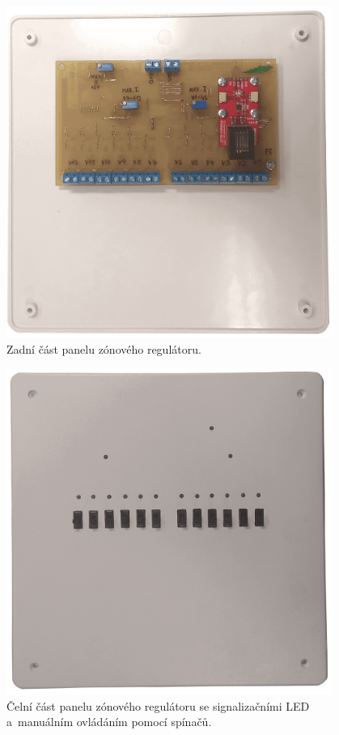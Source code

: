 \begin{figure}[H]
    \centering
    \includegraphics[width=0.95\textwidth]{images/zonovy-regulator/zonovy-regulator-spodni-strana.png}
    \caption{Zadní část panelu zónového regulátoru.}
    \label{fig:zonovy-regulator-spodni-strana}
\end{figure}

\begin{figure}[H]
    \centering
    \includegraphics[width=0.95\textwidth]{images/zonovy-regulator/zonovy-regulator-vrchni-strana.png}
    \caption[Čelní část panelu zónového regulátoru.]{Čelní část panelu zónového regulátoru se signalizačními LED a~manuálním ovládáním pomocí spínačů.}
    \label{fig:zonovy-regulator-vrchni-strana}
\end{figure}




